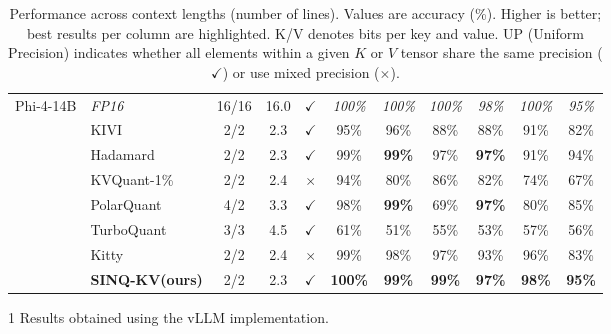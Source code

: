 \documentclass{llmxive}
\providecommand{\ours}[1]{\cellcolor{customblue!30}#1}
\providecommand{\others}[1]{\cellcolor{gray!10}#1}
\providecommand{\methodname}{SINQ-KV\xspace}
\begin{document}
\begin{table}[t]
\begin{threeparttable}
\begin{tabular}{l l c c c c c c c c c}
\multirow{8}{*}{Phi-4-14B}
 & \textit{FP16} & 16/16 & 16.0 & $\checkmark$
   & \textit{100\%} & \textit{100\%} & \textit{100\%} & \textit{98\%} & \textit{100\%} & \textit{95\%} \\
\cmidrule(lr){2-11}
 & \others{KIVI} & \others{2/2} & \others{2.3} & \others{$\checkmark$} & \others{95\%} & \others{96\%} & \others{88\%} & \others{88\%} & \others{91\%} & \others{82\%} \\
 & \others{Hadamard} & \others{2/2} & \others{2.3} & \others{$\checkmark$} & \others{99\%} & \others{\textbf{99\%}} & \others{97\%} & \others{\textbf{97\%}} & \others{91\%} & \others{94\%} \\
 & \others{KVQuant-1\%} & \others{2/2} & \others{2.4} & \others{$\times$} & \others{94\%} & \others{80\%} & \others{86\%} & \others{82\%} & \others{74\%} & \others{67\%} \\
 & \others{PolarQuant} & \others{4/2} & \others{3.3} & \others{$\checkmark$} & \others{98\%} & \others{\textbf{99\%}} & \others{69\%} & \others{\textbf{97\%}} & \others{80\%} & \others{85\%} \\
 & \others{TurboQuant\tnote{1}} & \others{3/3} & \others{4.5} & \others{$\checkmark$} & \others{61\%} & \others{51\%} & \others{55\%} & \others{53\%} & \others{57\%} & \others{56\%} \\
 & \others{Kitty} & \others{2/2} & \others{2.4} & \others{$\times$} & \others{99\%} & \others{98\%} & \others{97\%} & \others{93\%} & \others{96\%} & \others{83\%} \\
 & \textbf{\ours{\methodname (ours)}} 
   & \ours{2/2} & \ours{2.3} & \ours{$\checkmark$}
   & \textbf{\ours{100\%}} & \textbf{\ours{99\%}} & \textbf{\ours{99\%}} & \textbf{\ours{97\%}} & \textbf{\ours{98\%}} & \textbf{\ours{95\%}} \\
\bottomrule
\bottomrule
\end{tabular}
\begin{tablenotes}
\item[1]Results obtained using the vLLM implementation.
\end{tablenotes}
\end{threeparttable}
\caption{Performance across context lengths (number of lines). Values are accuracy (\%). Higher is better; best results per column are highlighted. K/V denotes bits per key and value. UP (Uniform Precision) indicates whether all elements within a given $K$ or $V$ tensor share the same precision ($\checkmark$) or use mixed precision ($\times$).}
\label{tab:kv_quant_results}
\end{table}
\end{document}
